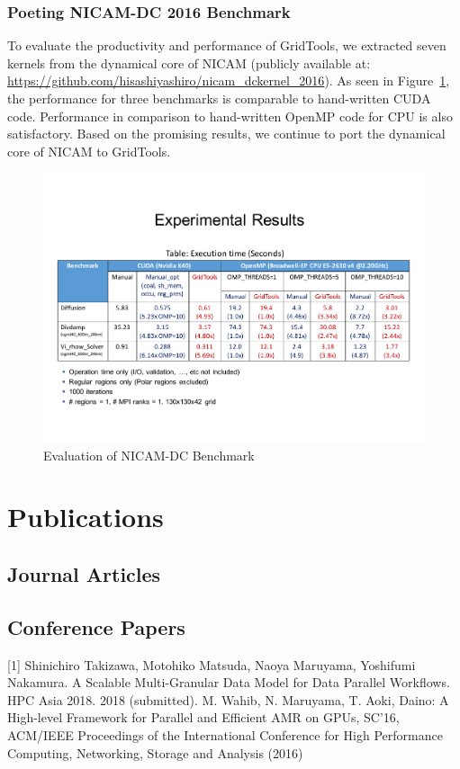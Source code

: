 \documentclass{book}
\begin{document}
\subsubsection{Poeting NICAM-DC 2016 Benchmark}
To evaluate the productivity and performance of GridTools, we extracted seven kernels from the dynamical core of NICAM (publicly available at: \url{https://github.com/hisashiyashiro/nicam_dckernel_2016}). As seen in Figure~\ref{fig:5}, the performance for three benchmarks is comparable to hand-written CUDA code. Performance in comparison to hand-written OpenMP code for CPU is also satisfactory. Based on the promising results, we continue to port the dynamical core of NICAM to GridTools.
\begin{figure}[h]
\centering
\includegraphics[width=1.0\textwidth]{figs/nicam01.pdf}%
\caption{Evaluation of NICAM-DC Benchmark}
\label{fig:5}
\end{figure}
\section{Publications}

\subsection{Journal Articles}

\subsection{Conference Papers}

[1] Shinichiro Takizawa, Motohiko Matsuda, Naoya Maruyama, Yoshifumi Nakamura. A Scalable Multi-Granular Data Model for Data Parallel Workflows. HPC Asia 2018. 2018 (submitted). \newline
[2] M. Wahib, N. Maruyama, T. Aoki, Daino: A High-level Framework for Parallel and Efficient AMR on GPUs, SC'16, ACM/IEEE Proceedings of the International Conference for High Performance Computing, Networking, Storage and Analysis (2016) \newline
\end{document}
